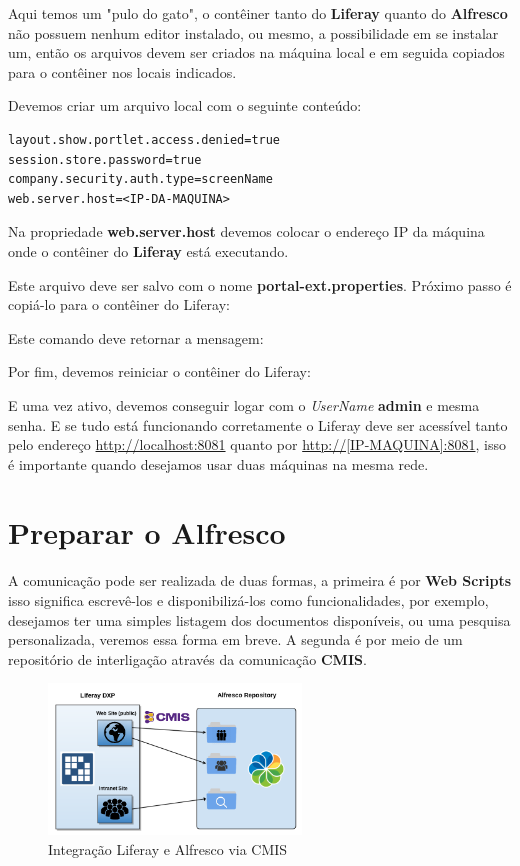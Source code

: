 \documentclass[a4paper,11pt]{article}
\begin{document}
Aqui temos um "pulo do gato", o contêiner tanto do \textbf{Liferay} quanto do \textbf{Alfresco} não possuem nenhum editor instalado, ou mesmo, a possibilidade em se instalar um, então os arquivos devem ser criados na máquina local e em seguida copiados para o contêiner nos locais indicados.

Devemos criar um arquivo local com o seguinte conteúdo:
\begin{lstlisting}
layout.show.portlet.access.denied=true
session.store.password=true
company.security.auth.type=screenName
web.server.host=<IP-DA-MAQUINA>
\end{lstlisting}

Na propriedade \textbf{web.server.host} devemos colocar o endereço IP da máquina onde o contêiner do \textbf{Liferay} está executando.

Este arquivo deve ser salvo com o nome \textbf{portal-ext.properties}. Próximo passo é copiá-lo para o contêiner do Liferay: \\

Este comando deve retornar a mensagem: \\

Por fim, devemos reiniciar o contêiner do Liferay: \\

E uma vez ativo, devemos conseguir logar com o \textit{UserName} \textbf{admin} e mesma senha. E se tudo está funcionando corretamente o Liferay deve ser acessível tanto pelo endereço \url{http://localhost:8081} quanto por \url{http://[IP-MAQUINA]:8081}, isso é importante quando desejamos usar duas máquinas na mesma rede.

\section{Preparar o Alfresco}
A comunicação pode ser realizada de duas formas, a primeira é por \textbf{Web Scripts} isso significa escrevê-los e disponibilizá-los como funcionalidades, por exemplo, desejamos ter uma simples listagem dos documentos disponíveis, ou uma pesquisa personalizada, veremos essa forma em breve. A segunda é por meio de um repositório de interligação através da comunicação \textbf{CMIS}.
\begin{figure}[!htb]
	\centering
	\includegraphics[width=0.6\textwidth]{imagens/IntegraAlfLife}
	\caption{Integração Liferay e Alfresco via CMIS}
\end{figure}
\end{document}
